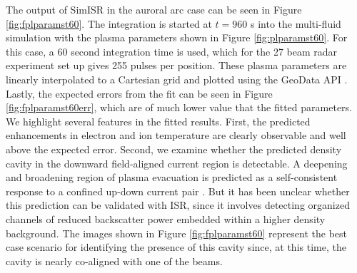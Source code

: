 The output of SimISR in the auroral arc case can be seen in Figure \ref{fig:fplparamst60}. The integration is started at $t=960$ s into the multi-fluid simulation with the plasma parameters shown in Figure \ref{fig:plparamst60}. For this case, a 60 second integration time is used, which for the 27 beam radar experiment set up gives 255 pulses per position. These plasma parameters are linearly interpolated to a Cartesian grid and plotted using the GeoData API \citep{john_swoboda_2016_154533}. Lastly, the expected errors from the fit can be seen in Figure \ref{fig:fplparamst60err}, which are of much lower value that the fitted parameters.
We highlight several features in the fitted results. First, the predicted enhancements in electron and ion temperature are clearly observable and well above the expected error. Second, we examine whether the predicted density cavity in the downward field-aligned current region is  detectable. A deepening and broadening region of plasma evacuation is predicted as a self-consistent response to a confined up-down current pair \citep{cran;cavity}.  But it has been unclear whether this prediction can be validated with ISR, since it involves detecting organized channels of reduced backscatter power embedded within a higher density background.
The images shown in Figure \ref{fig:fplparamst60} represent the best case scenario for identifying the presence of this cavity since, at this time, the cavity is nearly co-aligned with one of the beams. 
